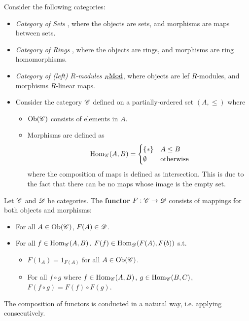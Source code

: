 \begin{example}
    Consider the following categories:
    \begin{itemize}
        \item \emph{Category of Sets} \catsets, where the objects are sets, and morphisms are maps between sets.
        \item \emph{Category of Rings} \catrings, where the objects are rings, and morphisms are ring homomorphisms.
        \item \emph{Category of (left) $R$-modules} ${}_{R}\underline{\textup{Mod}}$, where objects are lef $R$-modules, and morphisms $R$-linear maps.
        \item Consider the category $\mathscr{C}$ defined on a partially-ordered set $(A, \leq)$ where 
        \begin{itemize}
            \item $\mathrm{Ob}(\mathscr{C})$ consists of elements in $A$. 
            \item Morphisms are defined as
            \[
                \mathrm{Hom}_{\mathscr{C}}(A, B) = \begin{cases}
                    \{\ast\} & A \leq B \\
                    \emptyset & \text{otherwise}
                \end{cases}
            \]
            where the composition of maps is defined as intersection. This is due to the fact that there can be no maps whose image is the empty set.
        \end{itemize}
    \end{itemize}
\end{example}

\begin{definition}[Functor]
    Let $\mathscr{C}$ and $\mathscr{D}$ be categories. The \textbf{functor} $F: \mathscr{C} \to \mathscr{D}$ consists of mappings for both objects and morphisms:
    \begin{itemize}
        \item For all $A \in \mathrm{Ob}(\mathscr{C})$, $F(A) \in \mathscr{D}$.
        \item For all $f\in \mathrm{Hom}_{\mathscr{C}}(A, B)$. $F(f) \in \mathrm{Hom}_{\mathscr{D}} (F(A), F(b))$ s.t. 
        \begin{itemize}
            \item $F(1_A) = 1_{F(A)}$ for all $A \in \mathrm{Ob}(\mathscr{C})$. 
            \item For all $f \circ g$ where $f \in \mathrm{Hom}_{\mathscr{C}}(A, B)$, $g \in \mathrm{Hom}_{\mathscr{C}}(B, C)$, $F(f \circ g) = F(f) \circ F(g)$.
        \end{itemize}
    \end{itemize}
    The composition of functors is conducted in a natural way, i.e. applying consecutively. 
\end{definition}

